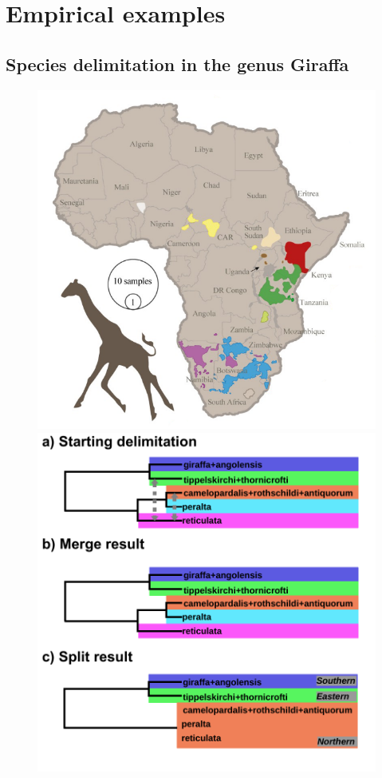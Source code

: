 \documentclass[A4]{article1}
\begin{document}
\clearpage
\newpage
\section{Empirical examples}

\subsection{Species delimitation in the genus Giraffa}

\begin{figure}[t]
    \centering %
    \includegraphics[scale=0.25]{figs/fig-giraffe} %
    \includegraphics[width=\linewidth]{figs/Giraffe/giraffe_progress_vector}  %
    

\end{figure}
\end{document}
